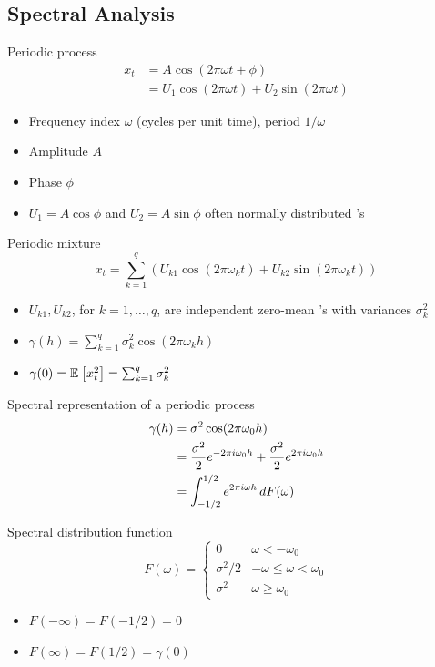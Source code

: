 \documentclass[landscape]{article}
\begin{document}
\begin{multicols*}{2}
\subsection{Spectral Analysis}

Periodic process
\begin{align*}
  x_t 
  &= A \cos(2\pi\omega t + \phi) \\
  &= U_1 \cos(2\pi \omega t) + U_2 \sin(2\pi \omega t)
\end{align*}

\begin{itemize}
  \item Frequency index $\omega$ (cycles per unit time), period $1/\omega$
  \item Amplitude $A$
  \item Phase $\phi$
  \item $U_1 = A\cos\phi$ and $U_2 = A\sin\phi$ often normally distributed \rv's
\end{itemize}

Periodic mixture
$$x_t = \sum_{k=1}^q\left( U_{k1}\cos(2\pi\omega_k t) 
+ U_{k2}\sin(2\pi\omega_k t)
\right)$$
\begin{itemize}
  \item $U_{k1}, U_{k2}$, for $k=1,\ldots,q$, 
    are independent zero-mean \rv's with variances $\sigma_k^2$
  \item $\gamma(h) = \sum_{k=1}^q \sigma_k^2 \cos(2\pi\omega_k h)$
  \item $\gamma(0) = \mathbb{E}_{}\left[x_t^2\right] = \sum_{k=1}^q \sigma_k^2$
\end{itemize}

Spectral representation of a periodic process
\begin{align*}
\gamma(h) 
&= \sigma^2 \cos(2\pi\omega_0 h) \\
&= \frac{\sigma^2}{2} e^{-2\pi i \omega_0 h} 
+ \frac{\sigma^2}{2} e^{2\pi i \omega_0 h}\\
&= \int_{-1/2}^{1/2} e^{2\pi i \omega h} \,dF(\omega)
\end{align*}

Spectral distribution function
$$F(\omega)= \begin{cases}
  0 & \omega < -\omega_0 \\
  \sigma^2/2 & -\omega \le \omega < \omega_0 \\
  \sigma^2 & \omega \ge \omega_0
\end{cases}$$
\begin{itemize}
  \item $F(-\infty) = F(-1/2) = 0$
  \item $F(\infty) = F(1/2) = \gamma(0)$
\end{itemize}


\end{multicols*}
\end{document}
